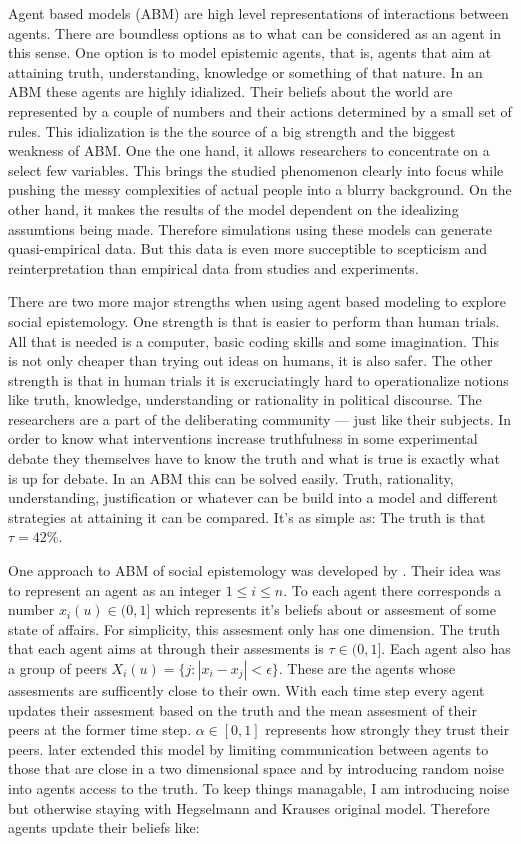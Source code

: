 \documentclass{essay-formal}
\begin{document}
Agent based models (ABM) are high level representations of interactions between agents. There are boundless options as to what can be considered as an agent in this sense. One option is to model epistemic agents, that is, agents that aim at attaining truth, understanding, knowledge or something of that nature. In an ABM these agents are highly idialized. Their beliefs about the world are represented by a couple of numbers and their actions determined by a small set of rules. This idialization is the the source of a big strength and the biggest weakness of ABM. One the one hand, it allows researchers to concentrate on a select few variables. This brings the studied phenomenon clearly into focus while pushing the messy complexities of actual people into a blurry background. On the other hand, it makes the results of the model dependent on the idealizing assumtions being made. Therefore simulations using these models can generate quasi-empirical data. But this data is even more succeptible to scepticism and reinterpretation than empirical data from studies and experiments.

There are two more major strengths when using agent based modeling to explore social epistemology. One strength is that is easier to perform than human trials. All that is needed is a computer, basic coding skills and some imagination. This is not only cheaper than trying out ideas on humans, it is also safer. The other strength is that in human trials it is excruciatingly hard to operationalize notions like truth, knowledge, understanding or rationality in political discourse. The researchers are a part of the deliberating community --- just like their subjects. In order to know what interventions increase truthfulness in some experimental debate they themselves have to know the truth and what is true is exactly what is up for debate. In an ABM this can be solved easily. Truth, rationality, understanding, justification or whatever can be build into a model and different strategies at attaining it can be compared. It's as simple as: The truth is that $\tau = 42\%$.

One approach to ABM of social epistemology was developed by \cite{hegselmann2009}. Their idea was to represent an agent as an integer $1 \leq i \leq n$. To each agent there corresponds a number $x_i(u) \in (0, 1]$ which represents it's beliefs about or assesment of some state of affairs. For simplicity, this assesment only has one dimension. The truth that each agent aims at through their assesments is $\tau \in (0, 1]$. Each agent also has a group of peers $X_i(u) = \{j: |x_i - x_j| < \epsilon\}$. These are the agents whose assesments are sufficently close to their own. With each time step every agent updates their assesment based on the truth and the mean assesment of their peers at the former time step. $\alpha \in [0, 1]$ represents how strongly they trust their peers. \textcite{riegler2010} later extended this model by limiting communication between agents to those that are close in a two dimensional space and by introducing random noise into agents access to the truth. To keep things managable, I am introducing noise but otherwise staying with Hegselmann and Krauses original model. Therefore agents update their beliefs like:
\end{document}
